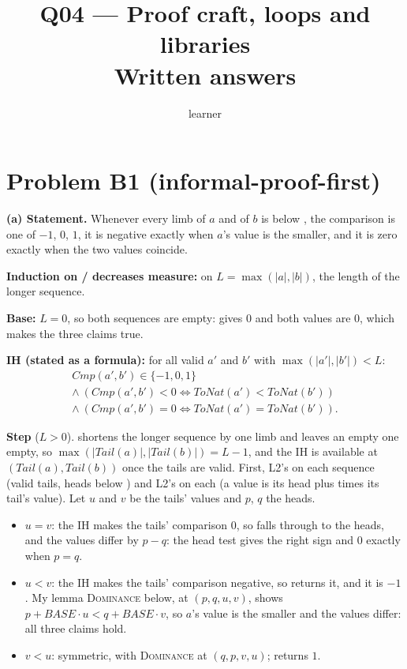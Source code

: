 \documentclass[11pt]{article}
\title{Q04 --- Proof craft, loops and libraries \\ \large Written answers}
\author{learner}
\date{}
\begin{document}
\maketitle

\section*{Problem B1 (informal-proof-first)}\label{ans:B1}
\begin{answer}
\textbf{(a) Statement.} Whenever every limb of $a$ and of $b$ is below
, the comparison is one of $-1$, $0$, $1$, it is negative exactly
when $a$'s value is the smaller, and it is zero exactly when the two values
coincide.

\textbf{Induction on / decreases measure:} on $L = \max(|a|, |b|)$, the
length of the longer sequence.

\textbf{Base:} $L = 0$, so both sequences are empty:  gives $0$ and
both values are $0$, which makes the three claims true.

\textbf{IH (stated as a formula):} for all valid $a'$ and $b'$ with
$\max(|a'|, |b'|) < L$:
\[
\begin{array}{l}
\mathit{Cmp}(a', b') \in \{-1, 0, 1\} \\
\wedge\ (\mathit{Cmp}(a', b') < 0 \iff \mathit{ToNat}(a') < \mathit{ToNat}(b')) \\
\wedge\ (\mathit{Cmp}(a', b') = 0 \iff \mathit{ToNat}(a') = \mathit{ToNat}(b')).
\end{array}
\]

\textbf{Step} ($L > 0$).  shortens the longer sequence by one limb
and leaves an empty one empty, so $\max(|\mathit{Tail}(a)|,
|\mathit{Tail}(b)|) = L - 1$, and the IH is available at
$(\mathit{Tail}(a), \mathit{Tail}(b))$ once the tails are valid. First,
L2's  on each sequence (valid tails, heads below ) and
L2's  on each (a value is its head plus  times its
tail's value). Let $u$ and $v$ be the tails' values and $p$, $q$ the heads.
\begin{itemize}
\item $u = v$: the IH makes the tails' comparison $0$, so  falls
  through to the heads, and the values differ by $p - q$: the head test gives
  the right sign and $0$ exactly when $p = q$.
\item $u < v$: the IH makes the tails' comparison negative, so 
  returns it, and it is $-1$. My lemma \textsc{Dominance} below, at $(p, q, u,
  v)$, shows $p + \mathit{BASE} \cdot u < q + \mathit{BASE} \cdot v$, so $a$'s
  value is the smaller and the values differ: all three claims hold.
\item $v < u$: symmetric, with \textsc{Dominance} at $(q, p, v, u)$; 
  returns $1$.
\end{itemize}


\end{answer}
\end{document}
